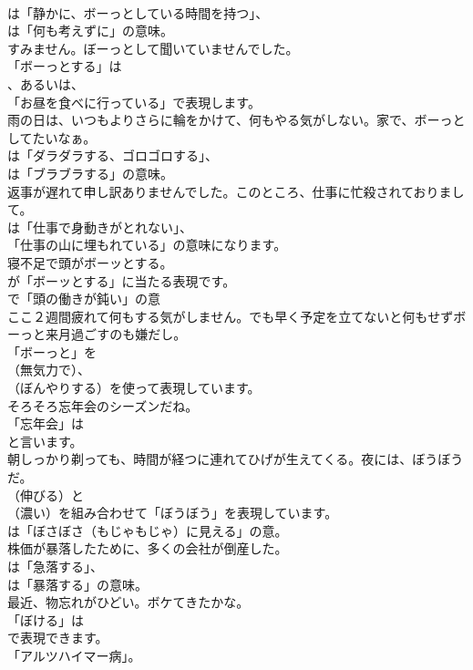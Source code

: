 \documentclass[8pt]{extreport}
\begin{document}
\begin{CJK}{UTF8}{min}
\\	は「静かに、ボーっとしている時間を持つ」、
\\	は「何も考えずに」の意味。	
\\	すみません。ぼーっとして聞いていませんでした。 
\\	「ボーっとする」は
\\	、あるいは、
\\	「お昼を食べに行っている」で表現します。	
\\	雨の日は、いつもよりさらに輪をかけて、何もやる気がしない。家で、ボーっとしてたいなぁ。 
\\	は「ダラダラする、ゴロゴロする」、
\\	は「ブラブラする」の意味。	
\\	返事が遅れて申し訳ありませんでした。このところ、仕事に忙殺されておりまして。 
\\	は「仕事で身動きがとれない」、
\\	「仕事の山に埋もれている」の意味になります。	
\\	寝不足で頭がボーッとする。 
\\	が「ボーッとする」に当たる表現です。
\\	で「頭の働きが鈍い」の意	
\\	ここ２週間疲れて何もする気がしません。でも早く予定を立てないと何もせずボーっと来月過ごすのも嫌だし。 
\\	「ボーっと」を 
\\	（無気力で）、
\\	（ぼんやりする）を使って表現しています。	
\\	そろそろ忘年会のシーズンだね。 
\\	「忘年会」は
\\	と言います。	
\\	朝しっかり剃っても、時間が経つに連れてひげが生えてくる。夜には、ぼうぼうだ。 
\\	（伸びる）と 
\\	（濃い）を組み合わせて「ぼうぼう」を表現しています。
\\	は「ぼさぼさ（もじゃもじゃ）に見える」の意。	
\\	株価が暴落したために、多くの会社が倒産した。 
\\	は「急落する」、
\\	は「暴落する」の意味。	
\\	最近、物忘れがひどい。ボケてきたかな。 
\\	「ぼける」は
\\	で表現できます。
\\	「アルツハイマー病」。	

\end{CJK}
\end{document}
